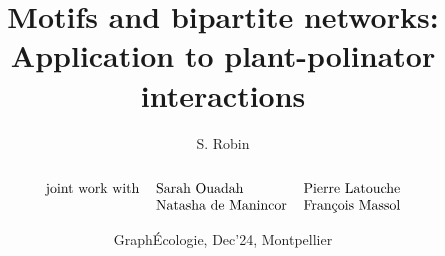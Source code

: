 \documentclass[8pt]{beamer}
\begin{document}
\title[Motifs and bipartite networks]{Motifs and bipartite networks: \\Application to plant-polinator interactions}
\author[S. Robin]{S. Robin \\ ~ \\
  $$
  \begin{tabular}{rll}
    joint work with & Sarah Ouadah & Pierre Latouche \\ 
    & Natasha de Manincor & Fran\c{c}ois Massol
  \end{tabular}
  $$
}
\date[Graph\'Ecologie, Dec'24]{Graph\'Ecologie, Dec'24, Montpellier}
\maketitle


\end{document}
